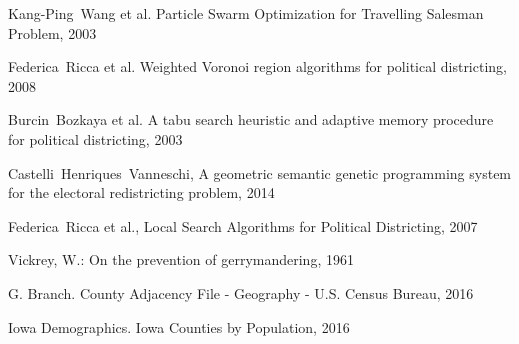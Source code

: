 \documentclass[journal]{IEEEtran}
\begin{document}
\begin{thebibliography}{1}

    Kang-Ping~Wang et al. Particle Swarm Optimization for Travelling Salesman
        Problem, 2003

    Federica~Ricca et al. Weighted Voronoi region algorithms for political
        districting, 2008

    Burcin~Bozkaya et al.  A tabu search heuristic and adaptive memory procedure
        for political districting, 2003

    Castelli~Henriques~Vanneschi, A geometric semantic genetic programming system for the electoral redistricting problem, 2014

    Federica~Ricca et al., Local Search Algorithms for Political Districting, 2007

    Vickrey, W.: On the prevention of gerrymandering, 1961

    G. Branch. County Adjacency File - Geography - U.S. Census Bureau, 2016

    Iowa Demographics. Iowa Counties by Population, 2016


\end{thebibliography}
\end{document}
